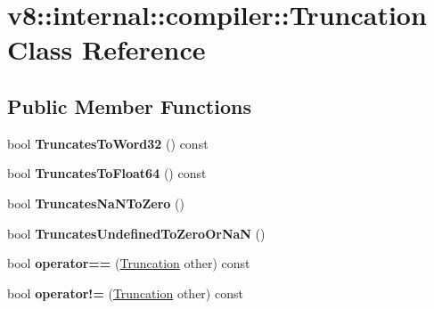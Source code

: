 \hypertarget{classv8_1_1internal_1_1compiler_1_1_truncation}{}\section{v8\+:\+:internal\+:\+:compiler\+:\+:Truncation Class Reference}
\label{classv8_1_1internal_1_1compiler_1_1_truncation}
\subsection*{Public Member Functions}
\begin{DoxyCompactItemize}
\item 
bool {\bfseries Truncates\+To\+Word32} () const \hypertarget{classv8_1_1internal_1_1compiler_1_1_truncation_a760430d0f49d3e776026e6db888d0dcc}{}\label{classv8_1_1internal_1_1compiler_1_1_truncation_a760430d0f49d3e776026e6db888d0dcc}

\item 
bool {\bfseries Truncates\+To\+Float64} () const \hypertarget{classv8_1_1internal_1_1compiler_1_1_truncation_af6a54019fc9b8afe46a44fd2ef9de141}{}\label{classv8_1_1internal_1_1compiler_1_1_truncation_af6a54019fc9b8afe46a44fd2ef9de141}

\item 
bool {\bfseries Truncates\+Na\+N\+To\+Zero} ()\hypertarget{classv8_1_1internal_1_1compiler_1_1_truncation_a08689f2e2a934e96c8fa1652297c3ea0}{}\label{classv8_1_1internal_1_1compiler_1_1_truncation_a08689f2e2a934e96c8fa1652297c3ea0}

\item 
bool {\bfseries Truncates\+Undefined\+To\+Zero\+Or\+NaN} ()\hypertarget{classv8_1_1internal_1_1compiler_1_1_truncation_aac7f9fab5be760956bd76318f1df0968}{}\label{classv8_1_1internal_1_1compiler_1_1_truncation_aac7f9fab5be760956bd76318f1df0968}

\item 
bool {\bfseries operator==} (\hyperlink{classv8_1_1internal_1_1compiler_1_1_truncation}{Truncation} other) const \hypertarget{classv8_1_1internal_1_1compiler_1_1_truncation_aab2c3fc97517eae4b191a62206c826fd}{}\label{classv8_1_1internal_1_1compiler_1_1_truncation_aab2c3fc97517eae4b191a62206c826fd}

\item 
bool {\bfseries operator!=} (\hyperlink{classv8_1_1internal_1_1compiler_1_1_truncation}{Truncation} other) const \hypertarget{classv8_1_1internal_1_1compiler_1_1_truncation_a8876accb4d597475c6bbdbe963e377db}{}\label{classv8_1_1internal_1_1compiler_1_1_truncation_a8876accb4d597475c6bbdbe963e377db}


\end{DoxyCompactItemize}
